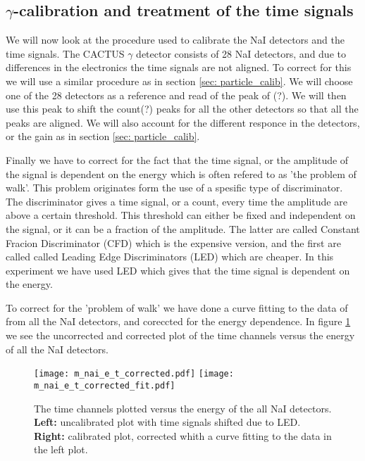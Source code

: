 \documentclass[11pt,a4wide]{article}
\begin{document}
\subsection{$\gamma$-calibration and treatment of the time signals}
We will now look at the procedure used to calibrate the NaI detectors and the time signals. The CACTUS $\gamma$ detector consists of 28 NaI detectors, and due to differences in the electronics the time signals are not aligned. To correct for this we will use a similar procedure as in section \ref{sec: particle_calib}. We will choose one of the 28 detectors as a reference and read of the peak of (?). We will then use this peak to shift the count(?) peaks for all the other detectors so that all the peaks are aligned. We will also account for the different responce in the detectors, or the gain as in section \ref{sec: particle_calib}.

Finally we have to correct for the fact that the time signal, or the amplitude of the signal is dependent on the energy which is often refered to as 'the problem of walk'. This problem originates form the use of a spesific type of discriminator. The discriminator gives a time signal, or a count, every time the amplitude are above a certain threshold. This threshold can either be fixed and independent on the signal, or it can be a fraction of the amplitude. The latter are called Constant Fracion Discriminator (CFD) which is the expensive version, and the first are called called Leading Edge Discriminators (LED) which are cheaper. In this experiment we have used LED which gives that the time signal is dependent on the energy. 

To correct for the 'problem of walk' we have done a curve fitting to the data of from all the NaI detectors, and coreccted for the energy dependence. In figure \ref{fig: time_corr} we see the uncorrected and corrected plot of the time channels versus the energy of all the NaI detectors.

\begin{figure}[htp]
\centering
\texttt{[image: m\_nai\_e\_t\_corrected.pdf]}
\texttt{[image: m\_nai\_e\_t\_corrected\_fit.pdf]}
\caption{The time channels plotted versus the energy of the all NaI detectors. \textbf{Left:} uncalibrated plot with time signals shifted due to LED. \textbf{Right:} calibrated plot, corrected whith a curve fitting to the data in the left plot.}
\label{fig: time_corr}
\end{figure}
\end{document}
